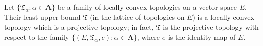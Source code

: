 Let $\{\mathfrak{T}_\alpha: \alpha \in \mathbf{A}\}$ be a family of locally convex topologies on a vector space $E$. Their least upper bound $\mathfrak{T}$ (in the lattice of topologies on $E$) is a locally convex topology which is a projective topology; in fact, $\mathfrak{T}$ is the projective topology with respect to the family $\{(E, \mathfrak{T}_\alpha, e): \alpha \in \mathbf{A}\}$, where $e$ is the identity map of $E$.
